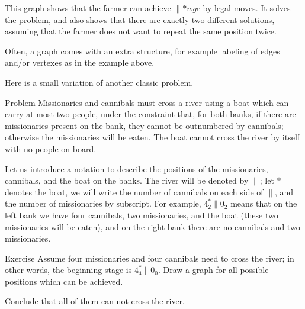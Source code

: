 \begin{center}
\end{center}

This graph shows that the farmer can achieve ${}{\parallel}{{*}wgc}$ by legal moves.
It solves the problem, and also shows that there are exactly two different solutions,
assuming that the farmer does not want to repeat the same position twice. 
\qeds

Often, a graph comes with an extra structure, for example labeling of edges and/or vertexes as in the example above.

Here is a small variation of another classic problem.

\begin{thm}{Problem} Missionaries and cannibals must cross a river using a boat which can carry at most two people, under the constraint that, for both banks, if there are missionaries present on the bank, they cannot be outnumbered by cannibals; otherwise the missionaries will be eaten.
The boat cannot cross the river by itself with no people on board.
\end{thm}

Let us introduce a notation to describe the positions of the missionaries, cannibals, and the boat on the banks.
The river will be denoted by ${\parallel}$;
let $*$ denotes the boat, we will write the number of cannibals on each side of ${\parallel}$, and the number of missionaries by subscript. 
For example, $4_2^*{\parallel}0_2$ means that on the left bank we have four cannibals, two missionaries, and the boat (these two missionaries will be eaten), and on the right bank there are no cannibals and two missionaries.

\begin{thm}{Exercise}
Assume four missionaries and four cannibals need to cross the river; in other words, the beginning stage is $4_4^*{\parallel}0_0$.
Draw a graph for all possible positions which can be achieved.

Conclude that all of them can not cross the river.
\end{thm}
